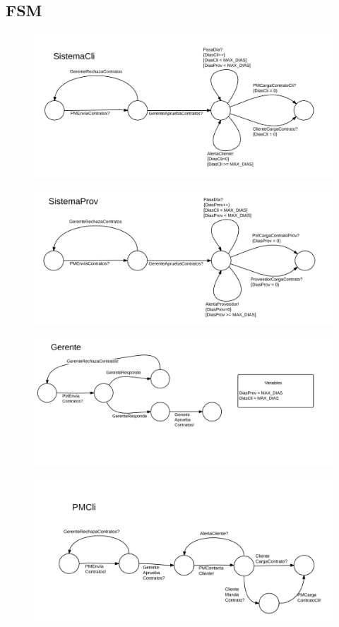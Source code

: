 \subsection{FSM}
\begin{figure}[H]
\includegraphics[width=\linewidth]{f1.png}
\end{figure}
\begin{figure}[H]
\includegraphics[width=\linewidth]{f2.png}
\end{figure}
\begin{figure}[H]
\includegraphics[width=\linewidth]{f3.png}
\end{figure}
\begin{figure}[H]
\includegraphics[width=\linewidth]{f4.png}
\end{figure}
